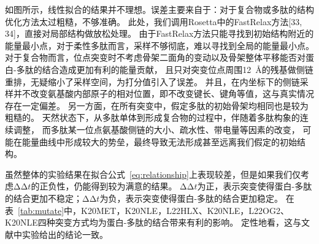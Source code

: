 如图所示，线性拟合的结果并不理想。误差主要来自于：对于复合物或多肽的结构优化方法太过粗糙，不够准确。
此处，我们调用Rosetta中的FastRelax方法[33, 34]，直接对局部结构做放松处理。
由于FastRelax方法只能寻找到初始结构附近的能量最小点，对于柔性多肽而言，采样不够彻底，难以寻找到全局的能量最小点。
对于复合物而言，位点突变时不考虑骨架二面角的变动以及骨架整体平移能否对蛋白-多肽的结合造成更加有利的能量贡献，
且只对突变位点周围\SI{12}{Å}的残基做侧链重排，无疑缩小了采样空间，为打分值引入了误差。
并且，在内坐标下的侧链采样并不改变氨基酸内部原子的相对位置，即不改变键长、键角等值，这与真实情况存在一定偏差。
另一方面，在所有突变中，假定多肽的初始骨架均相同也是较为粗糙的。
天然状态下，从多肽单体到形成复合物的过程中，伴随着多肽构象的连续调整，
而多肽某一位点氨基酸侧链的大小、疏水性、带电量等因素的改变，
可能在能量曲线中形成较大的势垒，最终导致无法形成甚至远离我们假定的初始结构。

虽然整体的实验结果在拟合公式~\eqref{eq:relationship}上表现较差，但是如果我们仅考虑$\increment\increment t$的正负性，仍能得到较为满意的结果。
$\increment\increment t$为正，表示突变使得蛋白-多肽的结合更加不稳定；$\increment\increment t$为负，表示突变使得蛋白-多肽的结合更加稳定。
在表~\ref{tab:mutate}中，K20MET，K20NLE，L22HLX、K20NLE，L22OG2、K20NLE四种突变方式均为蛋白-多肽的结合带来有利的影响。
定性地看，这与文献中实验给出的结论一致。